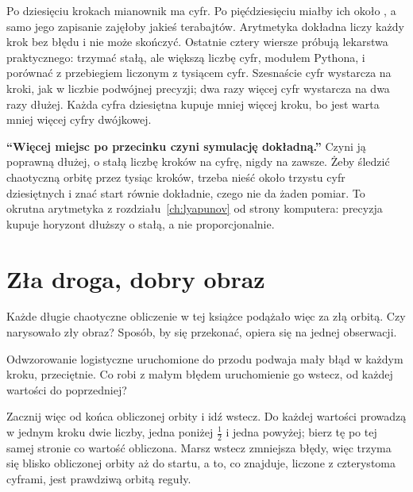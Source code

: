 

\noindent
Po dziesięciu krokach mianownik ma  cyfr. Po
pięćdziesięciu miałby ich około , a samo jego
zapisanie zajęłoby jakieś  terabajtów. Arytmetyka
dokładna liczy każdy krok bez błędu i nie może skończyć. Ostatnie cztery
wiersze próbują lekarstwa praktycznego: trzymać stałą, ale większą liczbę
cyfr, modułem  Pythona, i porównać z przebiegiem liczonym z
tysiącem cyfr. Szesnaście cyfr wystarcza na  kroki,
jak w liczbie podwójnej precyzji; dwa razy więcej cyfr wystarcza na dwa razy
dłużej. Każda cyfra dziesiętna kupuje mniej więcej 
kroku, bo jest warta mniej więcej  cyfry dwójkowej.

\begin{trapbox}
\textbf{\enquote{Więcej miejsc po przecinku czyni symulację dokładną.}}
Czyni ją poprawną dłużej, o stałą liczbę kroków na cyfrę, nigdy na zawsze.
Żeby śledzić chaotyczną orbitę przez tysiąc kroków, trzeba nieść około
trzystu cyfr dziesiętnych i znać start równie dokładnie, czego nie da żaden
pomiar. To okrutna arytmetyka z rozdziału~\ref{ch:lyapunov} od strony
komputera: precyzja kupuje horyzont dłuższy o stałą, a nie proporcjonalnie.
\end{trapbox}

\section{Zła droga, dobry obraz}
\label{sec:ch16-shadow}

\noindent
Każde długie chaotyczne obliczenie w tej książce podążało więc za złą
orbitą. Czy narysowało zły obraz? Sposób, by się przekonać, opiera się na
jednej obserwacji.

\begin{think}
Odwzorowanie logistyczne uruchomione do przodu podwaja mały błąd w każdym
kroku, przeciętnie. Co robi z małym błędem uruchomienie go wstecz, od każdej
wartości do poprzedniej?
\end{think}
Zacznij więc od końca obliczonej orbity i idź wstecz. Do każdej wartości
prowadzą w jednym kroku dwie liczby, jedna poniżej $\tfrac{1}{2}$ i jedna
powyżej; bierz tę po tej samej stronie co wartość obliczona. Marsz wstecz
zmniejsza błędy, więc trzyma się blisko obliczonej orbity aż do startu, a to,
co znajduje, liczone z czterystoma cyframi, jest prawdziwą orbitą reguły.

